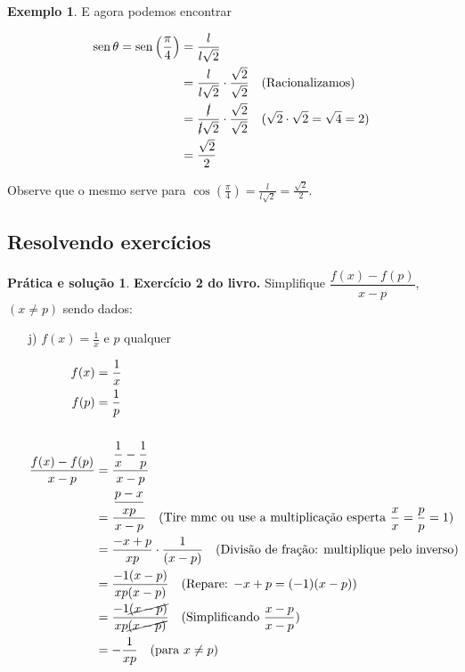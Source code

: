 \documentclass[12pt,openright,twoside,a4paper]{article}
\theoremstyle{definition}
\newtheorem{example}{Exemplo}[section]
\newtheorem{practice}{Prática e solução}[section]
\renewcommand{\sin}{\operatorname{sen}} %
\begin{document}
\begin{example}
		E agora podemos encontrar
		
		\begin{align*}
			\sin{\theta} = \sin{\left(\frac{\pi}{4}\right)} &= \frac{l}{l\sqrt{2}}\\
			&= \frac{l}{l\sqrt{2}} \cdot \frac{\sqrt{2}}{\sqrt{2}} \quad \text{(Racionalizamos)}\\
			&= \frac{\cancel{l}}{\cancel{l}\sqrt{2}} \cdot \frac{\sqrt{2}}{\sqrt{2}} \quad \text{($\sqrt{2} \cdot \sqrt{2} = \sqrt{4} = 2$)}\\
			&= \frac{\sqrt{2}}{2}
		\end{align*}
		
		Observe que o mesmo serve para $\displaystyle \cos{\left(\frac{\pi}{4}\right)} = \frac{l}{l\sqrt{2}} = \frac{\sqrt{2}}{2}$.
		
	\end{example}
	
	\subsection{Resolvendo exercícios}
	
	\begin{practice}
		\textbf{Exercício 2 do livro.} Simplifique $\dfrac{f(x) - f(p)}{x - p}$, $(x \neq p)$ sendo dados:
		
		\begin{enumerate}
			\item[j)] $f(x) = \displaystyle \frac{1}{x}$ e $p$ qualquer
			
			\begin{align*}
				f(x) &= \dfrac{1}{x} \\
				f(p) &= \dfrac{1}{p} \\
				\\
				\dfrac{f(x) - f(p)}{x - p} &= \dfrac{\dfrac{1}{x} - \dfrac{1}{p}}{x - p} \\
				&= \dfrac{\dfrac{p - x}{xp}}{x - p} \quad \text{(Tire mmc ou use a multiplicação esperta $\dfrac{x}{x} = \dfrac{p}{p} = 1$)}\\
				&= \dfrac{-x + p}{xp}\cdot \frac{1}{(x - p)} \quad \text{(Divisão de fração: multiplique pelo inverso)}\\
				&= \dfrac{-1(x - p)}{xp(x - p)} \quad \text{(Repare: $-x + p = (-1)(x - p)$)}\\
				&= \dfrac{-1\cancel{(x - p)}}{xp \cancel{(x - p)}} \quad \text{(Simplificando $\dfrac{x-p}{x-p}$)}\\
				&= -\dfrac{1}{xp} \quad \text{(para } x \ne p\text{)}
			\end{align*}
			
		\end{enumerate}
	\end{practice}
\end{document}
